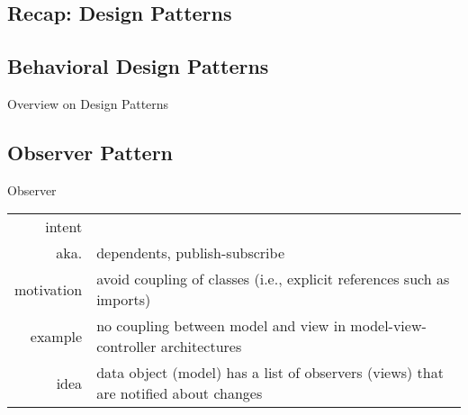 \subsection{Recap: Design Patterns}
\slideDesignPatterns

\subsection{Behavioral Design Patterns}
\begin{frame}[label=behavioralpatterns]{Overview on Design Patterns \mytitlesource{\gof}}
	\centering{}
\end{frame}

\subsection{Observer Pattern}
\begin{frame}{\insertsubsection} %
	\begin{fancycolumns}
		\begin{definition}{Observer \mysource{\gof}}
			\setlength\tabcolsep{1mm}
			\begin{tabularx}{\textwidth}{rX}				
				intent & \mycite{Define a one-to-many dependency between objects so that when one object changes state, all its dependents are notified and updated automatically.}\\
				aka. & dependents, publish-subscribe\\
				motivation & avoid coupling of classes (i.e., explicit references such as imports)\\
				example & no coupling between model and view in model-view-controller architectures\\
				idea & data object (model) has a list of observers (views) that are notified about changes
			\end{tabularx}
		\end{definition}
		\nextcolumn
	\end{fancycolumns}
\end{frame}

